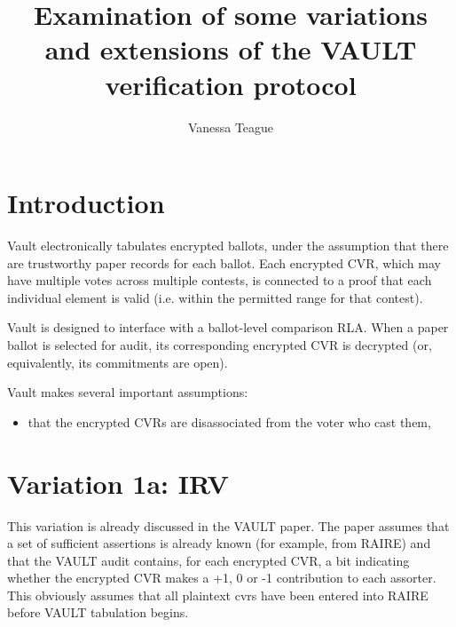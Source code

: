 \documentclass[10pt,a4paper]{article}
\begin{document}
	
	\title{Examination of some variations and extensions of the VAULT verification protocol}
	\author{Vanessa Teague}
	\maketitle
	
	\section{Introduction}

Vault electronically tabulates encrypted ballots, under the assumption that there are trustworthy paper records for each ballot. Each encrypted CVR, which may have multiple votes across multiple contests, is connected to a proof that each individual element is valid (i.e. within the permitted range for that contest).

Vault is designed to interface with a ballot-level comparison RLA. When a paper ballot is selected for audit, its corresponding encrypted CVR is decrypted (or, equivalently, its commitments are open).
	
	Vault makes several important assumptions:
	
	\begin{itemize}
		\item that the encrypted CVRs are disassociated from the voter who cast them,
	\end{itemize}
	
	\section{Variation 1a: IRV}
	This variation is already discussed in the VAULT paper. The paper assumes that a set of sufficient assertions is already known (for example, from RAIRE) and that the VAULT audit contains, for each encrypted CVR, a bit indicating whether the encrypted CVR makes a +1, 0 or -1 contribution to each assorter. This obviously assumes that all plaintext cvrs have been entered into RAIRE before VAULT tabulation begins.
	
\end{document}

